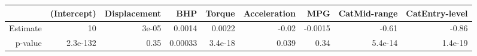 \begin{tabular}{rrrrrrrrr}
  \toprule
 & (Intercept) & Displacement & BHP & Torque & Acceleration & MPG & CatMid-range & CatEntry-level \\ 
  \midrule
Estimate &  10 & 3e-05 & 0.0014 & 0.0022 & -0.02 & -0.0015 & -0.61 & -0.86 \\ 
  p-value & 2.3e-132 & 0.35 & 0.00033 & 3.4e-18 & 0.039 & 0.34 & 5.4e-14 & 1.4e-19 \\ 
   \bottomrule
\end{tabular}
